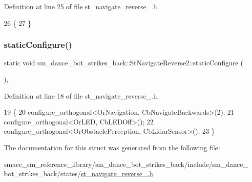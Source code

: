 Definition at line 25 of file st\+\_\+navigate\+\_\+reverse\+\_.\+h.


\begin{DoxyCode}
26    \{
27    \}
\end{DoxyCode}
\mbox{\label{structsm__dance__bot__strikes__back_1_1StNavigateReverse2_a5531cfb72b3afdd6d14e1afb5e73c223}} 
\subsubsection{\texorpdfstring{static\+Configure()}{staticConfigure()}}
{\footnotesize\ttfamily static void sm\+\_\+dance\+\_\+bot\+\_\+strikes\+\_\+back\+::\+St\+Navigate\+Reverse2\+::static\+Configure (\begin{DoxyParamCaption}{ }\end{DoxyParamCaption})\hspace{0.3cm}{\ttfamily [inline]}, {\ttfamily [static]}}



Definition at line 18 of file st\+\_\+navigate\+\_\+reverse\+\_.\+h.


\begin{DoxyCode}
19    \{
20       configure\_orthogonal<OrNavigation, CbNavigateBackwards>(2);
21       configure\_orthogonal<OrLED, CbLEDOff>();
22       configure\_orthogonal<OrObstaclePerception, CbLidarSensor>();
23    \}
\end{DoxyCode}


The documentation for this struct was generated from the following file\+:\begin{DoxyCompactItemize}
\item 
smacc\+\_\+sm\+\_\+reference\+\_\+library/sm\+\_\+dance\+\_\+bot\+\_\+strikes\+\_\+back/include/sm\+\_\+dance\+\_\+bot\+\_\+strikes\+\_\+back/states/\hyperlink{strikes__back_2include_2sm__dance__bot__strikes__back_2states_2st__navigate__reverse__2_8h}{st\+\_\+navigate\+\_\+reverse\+\_.\+h}\end{DoxyCompactItemize}
